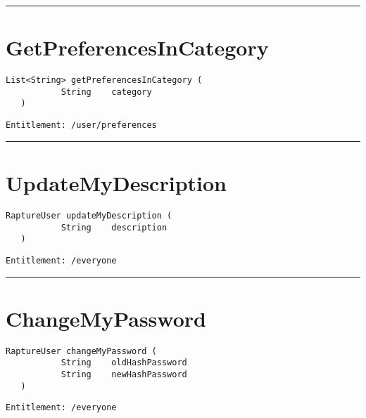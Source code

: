 \rule{12cm}{2pt}
\section{GetPreferencesInCategory}
\label{Api:GetPreferencesInCategory}
\begin{lstlisting}[style=nonumbers]
   List<String> getPreferencesInCategory (
           String    category
   )
\end{lstlisting}
\begin{Verbatim}[formatcom=\color{Maroon}]
  Entitlement: /user/preferences
\end{Verbatim}



\rule{12cm}{2pt}
\section{UpdateMyDescription}
\label{Api:UpdateMyDescription}
\begin{lstlisting}[style=nonumbers]
   RaptureUser updateMyDescription (
           String    description
   )
\end{lstlisting}
\begin{Verbatim}[formatcom=\color{Maroon}]
  Entitlement: /everyone
\end{Verbatim}



\rule{12cm}{2pt}
\section{ChangeMyPassword}
\label{Api:ChangeMyPassword}
\begin{lstlisting}[style=nonumbers]
   RaptureUser changeMyPassword (
           String    oldHashPassword
           String    newHashPassword
   )
\end{lstlisting}
\begin{Verbatim}[formatcom=\color{Maroon}]
  Entitlement: /everyone
\end{Verbatim}



